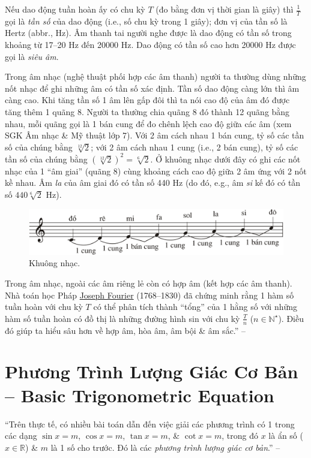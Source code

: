 \documentclass[oneside]{book}
\numberwithin{equation}{section}
\begin{document}
Nếu dao động tuần hoàn ấy có chu kỳ $T$ (đo bằng đơn vị thời gian là giây) thì $\frac{1}{T}$ gọi là \textit{tần số} của dao động (i.e., số chu kỳ trong 1 giây); đơn vị của tần số là Hertz (abbr., Hz). Âm thanh tai người nghe được là dao động có tần số trong khoảng từ 17--20 Hz đến 20000 Hz. Dao động có tần số cao hơn 20000 Hz được gọi là \textit{siêu âm}.

Trong âm nhạc (nghệ thuật phối hợp các âm thanh) người ta thường dùng những nốt nhạc để ghi những âm có tần số xác định. Tần số dao động càng lớn thì âm càng cao. Khi tăng tần số 1 âm lên gấp đôi thì ta nói cao độ của âm đó được tăng thêm 1 quãng 8. Người ta thường chia quãng 8 đó thành 12 quãng bằng nhau, mỗi quãng gọi là 1 bán cung để đo chênh lệch cao độ giữa các âm (xem SGK Âm nhạc \& Mỹ thuật lớp 7). Với 2 âm cách nhau 1 bán cung, tỷ số các tần số của chúng bằng $\sqrt[12]{2}$; với 2 âm cách nhau 1 cung (i.e., 2 bán cung), tỷ số các tần số của chúng bằng $(\sqrt[12]{2})^2 = \sqrt[6]{2}$. Ở khuông nhạc dưới đây có ghi các nốt nhạc của 1 ``âm giai'' (quãng 8) cùng khoảng cách cao độ giữa 2 âm ứng với 2 nốt kề nhau. Âm \textit{la} của âm giai đó có tần số 440 Hz (do đó, e.g., âm \textit{si} kế đó có tần số $440\sqrt[6]{2}$ Hz).

\begin{figure}[H]
	\centering
	\includegraphics[scale=0.2]{khuong_nhac}
	\caption{Khuông nhạc.}
	\label{fig:khuong nhac}
\end{figure}
Trong âm nhạc, ngoài các âm riêng lẻ còn có hợp âm (kết hợp các âm thanh). Nhà toán học Pháp \href{https://en.wikipedia.org/wiki/Joseph_Fourier}{Joseph Fourier} (1768--1830) đã chứng minh rằng 1 hàm số tuần hoàn với chu kỳ $T$ có thể phân tích thành ``tổng'' của 1 hằng số với những hàm số tuần hoàn có đồ thị là những đường hình sin với chu kỳ $\frac{T}{n}$ ($n\in\mathbb{N}^\star$). Điều đó giúp ta hiểu sâu hơn về hợp âm, hòa âm, âm bội \& âm sắc.'' -- \cite[p. 18]{SGK_Toan_11_dai_so_giai_tich_nang_cao}

\section{Phương Trình Lượng Giác Cơ Bản -- Basic Trigonometric Equation}
``Trên thực tế, có nhiều bài toán dẫn đến việc giải các phương trình có 1 trong các dạng $\sin x = m$, $\cos x = m$, $\tan x = m$, \& $\cot x = m$, trong đó $x$ là ẩn số ($x\in\mathbb{R}$) \& $m$ là 1 số cho trước. Đó là các \textit{phương trình lượng giác cơ bản}.'' -- \cite[p. 19]{SGK_Toan_11_dai_so_giai_tich_nang_cao}
\end{document}
